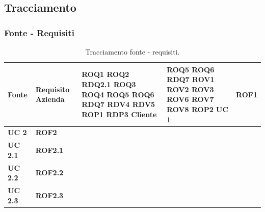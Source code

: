 \subsection{Tracciamento}
\subsubsection{Fonte - Requisiti}
\begin{longtable}{ |p{3cm}|p{3cm}|  }
    \caption{Tracciamento fonte - requisiti.}
    \label{tab:req-tracciamento}
    \hline
    \textbf{Fonte} & \textbf{Requisito}
    \hline
    \textbf{Azienda} &
                 \textbf{ROQ1}
        \newline \textbf{ROQ2}
        \newline \textbf{RDQ2.1}
        \newline \textbf{ROQ3}
        \newline \textbf{ROQ4}
        \newline \textbf{ROQ5}
        \newline \textbf{ROQ6}
        \newline \textbf{RDQ7}
        \newline \textbf{RDV4}
        \newline \textbf{RDV5}
        \newline \textbf{ROP1}
        \newline \textbf{RDP3}
        \hline
    \textbf{Cliente} &
                 \textbf{ROQ5} 
        \newline \textbf{ROQ6} 
        \newline \textbf{RDQ7} 
        \newline \textbf{ROV1}
        \newline \textbf{ROV2}
        \newline \textbf{ROV3}
        \newline \textbf{ROV6}
        \newline \textbf{ROV7}
        \newline \textbf{ROV8}
        \newline \textbf{ROP2}
        \hline
    \textbf{UC 1}       & \textbf{ROF1}        \\ \hline
    \textbf{UC 2}       & \textbf{ROF2}        \\ \hline
    \textbf{UC 2.1}     & \textbf{ROF2.1}      \\ \hline
    \textbf{UC 2.2}     & \textbf{ROF2.2}      \\ \hline
    \textbf{UC 2.3}     & \textbf{ROF2.3}      \\ \hline

\end{longtable}

